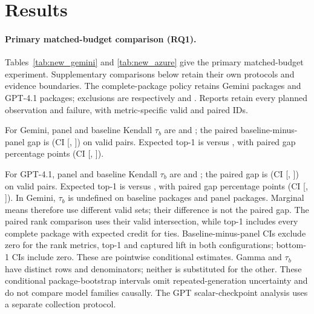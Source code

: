 \section{Results}
\paragraph{Primary matched-budget comparison (RQ1).}
Tables~\ref{tab:new_gemini} and \ref{tab:new_azure} give the primary matched-budget experiment.
Supplementary comparisons below retain their own protocols and evidence boundaries. The complete-package policy retains
\newGeminiN{} Gemini packages and \newGptN{} GPT-4.1 packages; exclusions are respectively
\newGeminiExcludedN{} and \newGptExcludedN{}. Reports retain every planned observation and
failure, with metric-specific valid and paired IDs.

For Gemini, panel and baseline Kendall $\tau_b$ are \newGeminiPanelTau{} and
\newGeminiBaselineTau{}; the paired baseline-minus-panel gap is \newGeminiGapTau{}
(CI [\newGeminiGapTauLow{}, \newGeminiGapTauHigh{}]) on \newGeminiPairedTauN{} valid pairs.
Expected top-1 is \newGeminiPanelTopOne{} versus \newGeminiBaselineTopOne{}, with paired gap
\newGeminiGapTopOne{} percentage points (CI
[\newGeminiGapTopOneLow{}, \newGeminiGapTopOneHigh{}]).

For GPT-4.1, panel and baseline Kendall $\tau_b$ are \newGptPanelTau{} and
\newGptBaselineTau{}; the paired gap is \newGptGapTau{}
(CI [\newGptGapTauLow{}, \newGptGapTauHigh{}]) on \newGptPairedTauN{} valid pairs.
Expected top-1 is \newGptPanelTopOne{} versus \newGptBaselineTopOne{}, with paired gap
\newGptGapTopOne{} percentage points (CI [\newGptGapTopOneLow{}, \newGptGapTopOneHigh{}]).
In Gemini, $\tau_b$ is undefined on \newGeminiBaselineRankUndefinedN{} baseline packages
and \newGeminiPanelRankUndefinedN{} panel packages. Marginal means therefore use different valid
sets; their difference is not the paired gap. The paired rank comparison uses their valid
intersection, while top-1 includes every complete package with expected credit for ties.
Baseline-minus-panel CIs exclude zero for the rank metrics, top-1 and captured lift in both
configurations; bottom-1 CIs include zero. These are pointwise conditional estimates.
Gamma and $\tau_b$ have distinct rows and denominators; neither is substituted for the other.
These conditional package-bootstrap intervals omit repeated-generation uncertainty and do not
compare model families causally. The GPT scalar-checkpoint analysis uses a separate collection protocol.


